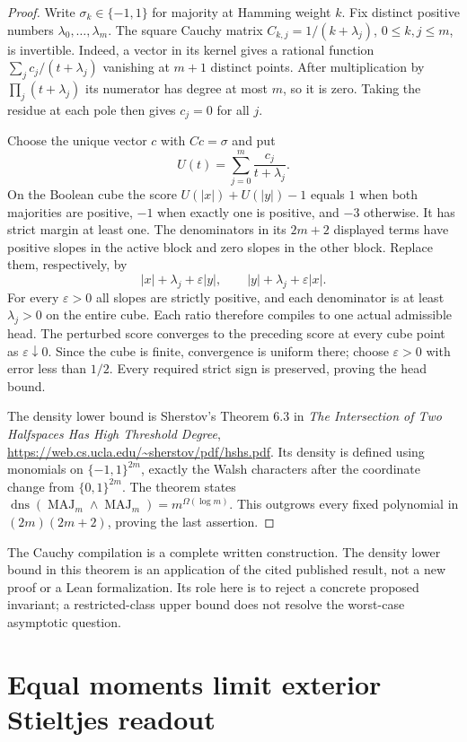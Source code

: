 \documentclass[11pt]{article}
\begin{document}
\begin{proof}
Write $\sigma_k\in\{-1,1\}$ for majority at Hamming weight $k$.
Fix distinct positive
numbers $\lambda_0,\ldots,\lambda_m$. The square Cauchy matrix
$C_{k,j}=1/(k+\lambda_j)$, $0\leq k,j\leq m$, is invertible.
Indeed, a vector in its kernel gives a rational function
$\sum_j c_j/(t+\lambda_j)$ vanishing at $m+1$ distinct points.
After multiplication by $\prod_j(t+\lambda_j)$ its numerator has
degree at most $m$, so it is zero. Taking the residue at each pole
then gives $c_j=0$ for all $j$.

Choose the unique vector $c$ with $Cc=\sigma$ and put
\[
 U(t)=\sum_{j=0}^m\frac{c_j}{t+\lambda_j}.
\]
On the Boolean cube the score
$U(|x|)+U(|y|)-1$ equals $1$ when both majorities are positive,
$-1$ when exactly one is positive, and $-3$ otherwise. It has strict
margin at least one. The denominators in its $2m+2$ displayed terms
have positive slopes in the active block and zero slopes in the
other block. Replace them, respectively, by
\[
 |x|+\lambda_j+\varepsilon|y|,
 \qquad |y|+\lambda_j+\varepsilon|x|.
\]
For every $\varepsilon>0$ all slopes are strictly positive, and each
denominator is at least $\lambda_j>0$ on the entire cube. Each ratio
therefore compiles to one actual admissible head. The perturbed
score converges to the preceding score at every cube point as
$\varepsilon\downarrow0$. Since the cube is finite, convergence is
uniform there; choose $\varepsilon>0$ with error less than $1/2$.
Every required strict sign is preserved, proving the head bound.

The density lower bound is Sherstov's Theorem 6.3 in
\emph{The Intersection of Two Halfspaces Has High Threshold Degree},
\url{https://web.cs.ucla.edu/~sherstov/pdf/hshs.pdf}. Its density is
defined using monomials on $\{-1,1\}^{2m}$, exactly the Walsh
characters after the coordinate change from $\{0,1\}^{2m}$.
The theorem states
$\operatorname{dns}(\operatorname{MAJ}_m\wedge
\operatorname{MAJ}_m)=m^{\Omega(\log m)}$. This outgrows every fixed
polynomial in $(2m)(2m+2)$, proving the last assertion.
\end{proof}

The Cauchy compilation is a complete written construction. The density
lower bound in this theorem is an application of the cited published
result, not a new proof or a Lean formalization. Its role here is to
reject a concrete proposed invariant; a restricted-class upper bound
does not resolve the worst-case asymptotic question.

\section{Equal moments limit exterior Stieltjes readout}
\end{document}
